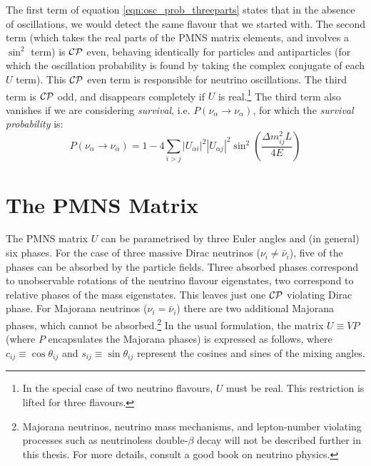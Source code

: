 The first term of equation \eqref{eqn:osc_prob_threeparts} states that in the absence of oscillations, we would detect the same flavour that we started with. The second term (which takes the real parts of the PMNS matrix elements, and involves a $\sin^2$ term) is $\mathcal{C}\mathcal{P}$ even, behaving identically for particles and antiparticles (for which the oscillation probability is found by taking the complex conjugate of each $U$ term). This $\mathcal{C}\mathcal{P}$ even term is responsible for neutrino oscillations. The third term is $\mathcal{C}\mathcal{P}$ odd, and disappears completely if $U$ is real.\footnote{In the special case of two neutrino flavours, $U$ must be real. This restriction is lifted for three flavours.} The third term also vanishes if we are considering \emph{survival}, i.e. $P(\nu_\alpha \rightarrow \nu_\alpha)$, for which the \emph{survival probability} is:
\begin{equation}\label{eqn:survival_probability}
P(\nu_\alpha \rightarrow \nu_\alpha) = 1 - 4\sum_{i>j} |U_{\alpha i}|^2 |U_{\alpha j}|^2 \sin^2 \left(\frac{\Delta m_{ij}^2 L}{4E}\right)
\end{equation}

\section{The PMNS Matrix}
The PMNS matrix $U$ can be parametrised by three Euler angles and (in general) six phases. For the case of three massive Dirac neutrinos ($\nu_i \ne \bar{\nu}_i$), five of the phases can be absorbed by the particle fields. Three absorbed phases correspond to unobservable rotations of the neutrino flavour eigenstates, two correspond to relative phases of the mass eigenstates. This leaves just one $\mathcal{C}\mathcal{P}$ violating Dirac phase. For Majorana neutrinos ($\nu_i = \bar{\nu}_i$) there are two additional Majorana phases, which cannot be absorbed.\footnote{Majorana neutrinos, neutrino mass mechanisms, and lepton-number violating processes such as neutrinoless double-$\beta$ decay will not be described further in this thesis. For more details, consult a good book on neutrino physics\citep{Zuber2004,Giunti2007}.} In the usual formulation\citep{PDG2011}, the matrix $U \equiv VP$ (where $P$ encapsulates the Majorana phases) is expressed as follows, where $c_{ij} \equiv \cos\theta_{ij}$ and $s_{ij} \equiv \sin\theta_{ij}$ represent the cosines and sines of the mixing angles.

